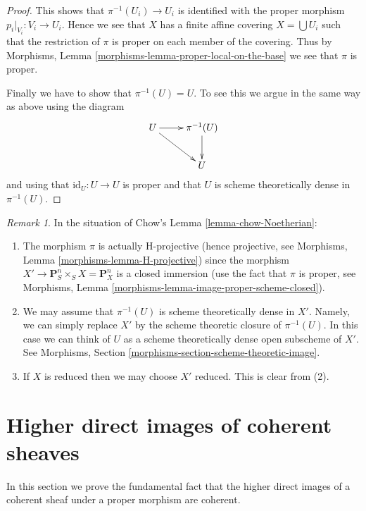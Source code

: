 \documentclass{stacks-project}
\theoremstyle{plain}
\theoremstyle{definition}
\theoremstyle{remark}
\newtheorem{remark}[subsection]{Remark}
\numberwithin{equation}{subsection}
\begin{document}
\begin{proof}
\medskip\noindent
This shows that $\pi^{-1}(U_i) \to U_i$ is identified with the proper
morphism $p_i|_{V_i} : V_i \to U_i$. Hence we see that $X$ has a
finite affine covering $X = \bigcup U_i$ such that the restriction
of $\pi$ is proper on each member of the covering.
Thus by Morphisms, Lemma \ref{morphisms-lemma-proper-local-on-the-base}
we see that $\pi$ is proper.

\medskip\noindent
Finally we have to show that $\pi^{-1}(U) = U$. To see this we argue in the
same way as above using the diagram
$$
\xymatrix{
U \ar[r] \ar[rd] & \pi^{-1}(U) \ar[d] \\
& U
}
$$
and using that $\text{id}_U : U \to U$ is proper and that
$U$ is scheme theoretically dense in $\pi^{-1}(U)$.
\end{proof}

\begin{remark}
\label{remark-chow-Noetherian}
In the situation of Chow's
Lemma \ref{lemma-chow-Noetherian}:
\begin{enumerate}
\item The morphism $\pi$ is actually H-projective (hence projective, see
Morphisms, Lemma \ref{morphisms-lemma-H-projective})
since the morphism $X' \to \mathbf{P}^n_S \times_S X = \mathbf{P}^n_X$
is a closed immersion (use the fact that $\pi$ is proper, see
Morphisms, Lemma \ref{morphisms-lemma-image-proper-scheme-closed}).
\item We may assume that $\pi^{-1}(U)$ is scheme theoretically dense
in $X'$. Namely, we can simply replace $X'$ by the scheme theoretic
closure of $\pi^{-1}(U)$. In this case we can think of $U$ as a
scheme theoretically dense open subscheme of $X'$.
See Morphisms, Section \ref{morphisms-section-scheme-theoretic-image}.
\item If $X$ is reduced then we may choose $X'$ reduced. This is clear
from (2).
\end{enumerate}
\end{remark}






\section{Higher direct images of coherent sheaves}
\label{section-proper-pushforward}

\noindent
In this section we prove the fundamental fact that the higher
direct images of a coherent sheaf under a proper morphism
are coherent.
\end{document}
